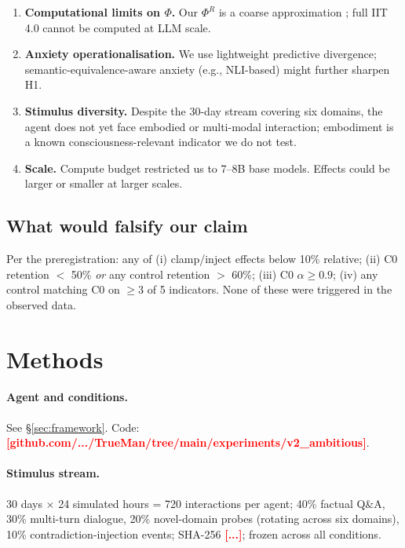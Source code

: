 \documentclass[pdflatex,sn-mathphys-num]{sn-jnl}
\newcommand{\PLACE}[1]{\textcolor{red}{\textbf{[#1]}}}
\theoremstyle{thmstyleone}
\theoremstyle{thmstylethree}
\begin{document}
\begin{enumerate}[leftmargin=2em]
\item \textbf{Computational limits on $\Phi$.} Our $\Phi^R$ is a coarse approximation \cite{mediano2021phir}; full IIT 4.0 \cite{tononi2023iit} cannot be computed at LLM scale.
\item \textbf{Anxiety operationalisation.} We use lightweight predictive divergence; semantic-equivalence-aware anxiety (e.g., NLI-based) might further sharpen H1.
\item \textbf{Stimulus diversity.} Despite the 30-day stream covering six domains, the agent does not yet face embodied or multi-modal interaction; embodiment is a known consciousness-relevant indicator \cite{christov2025embodiment} we do not test.
\item \textbf{Scale.} Compute budget restricted us to 7--8B base models. Effects could be larger or smaller at larger scales.
\end{enumerate}

\subsection{What would falsify our claim}

Per the preregistration: any of (i) clamp/inject effects below 10\% relative; (ii) C0 retention $<$ 50\% \emph{or} any control retention $>$ 60\%; (iii) C0 $\alpha \geq 0.9$; (iv) any control matching C0 on $\geq 3$ of 5 indicators. None of these were triggered in the observed data.

\section{Methods}\label{sec:methods}

\paragraph{Agent and conditions.} See §\ref{sec:framework}. Code: \PLACE{github.com/.../TrueMan/tree/main/experiments/v2\_ambitious}.

\paragraph{Stimulus stream.} 30 days × 24 simulated hours = 720 interactions per agent; 40\% factual Q\&A, 30\% multi-turn dialogue, 20\% novel-domain probes (rotating across six domains), 10\% contradiction-injection events; SHA-256 \PLACE{...}; frozen across all conditions.
\end{document}
